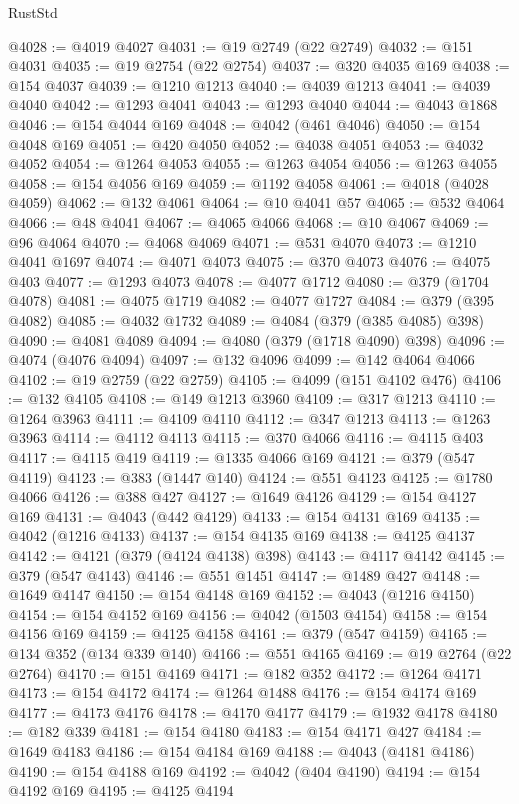 \begin{lexlean}{RustStd}
\begin{coremodule}
{\begin{coremodule}
{{{{{{{{{{{{{{{{{{{{{{{{{{{{{{{{{{{{{{{{{{{{{{{{{{{{{{{{{{{{{{{{{{{{{{{{{{{{{{{{@4028 := @4019 @4027
@4031 := @19 @2749 (@22 @2749)
@4032 := @151 @4031
@4035 := @19 @2754 (@22 @2754)
@4037 := @320 @4035 @169
@4038 := @154 @4037
@4039 := @1210 @1213
@4040 := @4039 @1213
@4041 := @4039 @4040
@4042 := @1293 @4041
@4043 := @1293 @4040
@4044 := @4043 @1868
@4046 := @154 @4044 @169
@4048 := @4042 (@461 @4046)
@4050 := @154 @4048 @169
@4051 := @420 @4050
@4052 := @4038 @4051
@4053 := @4032 @4052
@4054 := @1264 @4053
@4055 := @1263 @4054
@4056 := @1263 @4055
@4058 := @154 @4056 @169
@4059 := @1192 @4058
@4061 := @4018 (@4028 @4059)
@4062 := @132 @4061
@4064 := @10 @4041 @57
@4065 := @532 @4064
@4066 := @48 @4041
@4067 := @4065 @4066
@4068 := @10 @4067
@4069 := @96 @4064
@4070 := @4068 @4069
@4071 := @531 @4070
@4073 := @1210 @4041 @1697
@4074 := @4071 @4073
@4075 := @370 @4073
@4076 := @4075 @403
@4077 := @1293 @4073
@4078 := @4077 @1712
@4080 := @379 (@1704 @4078)
@4081 := @4075 @1719
@4082 := @4077 @1727
@4084 := @379 (@395 @4082)
@4085 := @4032 @1732
@4089 := @4084 (@379 (@385 @4085) @398)
@4090 := @4081 @4089
@4094 := @4080 (@379 (@1718 @4090) @398)
@4096 := @4074 (@4076 @4094)
@4097 := @132 @4096
@4099 := @142 @4064 @4066
@4102 := @19 @2759 (@22 @2759)
@4105 := @4099 (@151 @4102 @476)
@4106 := @132 @4105
@4108 := @149 @1213 @3960
@4109 := @317 @1213
@4110 := @1264 @3963
@4111 := @4109 @4110
@4112 := @347 @1213
@4113 := @1263 @3963
@4114 := @4112 @4113
@4115 := @370 @4066
@4116 := @4115 @403
@4117 := @4115 @419
@4119 := @1335 @4066 @169
@4121 := @379 (@547 @4119)
@4123 := @383 (@1447 @140)
@4124 := @551 @4123
@4125 := @1780 @4066
@4126 := @388 @427
@4127 := @1649 @4126
@4129 := @154 @4127 @169
@4131 := @4043 (@442 @4129)
@4133 := @154 @4131 @169
@4135 := @4042 (@1216 @4133)
@4137 := @154 @4135 @169
@4138 := @4125 @4137
@4142 := @4121 (@379 (@4124 @4138) @398)
@4143 := @4117 @4142
@4145 := @379 (@547 @4143)
@4146 := @551 @1451
@4147 := @1489 @427
@4148 := @1649 @4147
@4150 := @154 @4148 @169
@4152 := @4043 (@1216 @4150)
@4154 := @154 @4152 @169
@4156 := @4042 (@1503 @4154)
@4158 := @154 @4156 @169
@4159 := @4125 @4158
@4161 := @379 (@547 @4159)
@4165 := @134 @352 (@134 @339 @140)
@4166 := @551 @4165
@4169 := @19 @2764 (@22 @2764)
@4170 := @151 @4169
@4171 := @182 @352
@4172 := @1264 @4171
@4173 := @154 @4172
@4174 := @1264 @1488
@4176 := @154 @4174 @169
@4177 := @4173 @4176
@4178 := @4170 @4177
@4179 := @1932 @4178
@4180 := @182 @339
@4181 := @154 @4180
@4183 := @154 @4171 @427
@4184 := @1649 @4183
@4186 := @154 @4184 @169
@4188 := @4043 (@4181 @4186)
@4190 := @154 @4188 @169
@4192 := @4042 (@404 @4190)
@4194 := @154 @4192 @169
@4195 := @4125 @4194
}}}}}}}}}}}}}}}}}}}}}}}}}}}}}}}}}}}}}}}}}}}}}}}}}}}}}}}}}}}}}}}}}}}}}}}}}}}}}}}}
\end{coremodule}}
\end{coremodule}
\end{lexlean}
